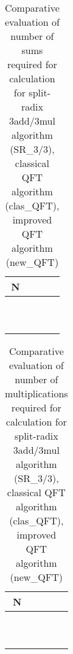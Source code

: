 \documentclass[a4paper,10pt]{article}
\begin{document}
\begin{table}[tb]
\caption{Comparative evaluation of number of sums required for  calculation for split-radix 3add/3mul algorithm (SR\_3/3), classical QFT algorithm 
(clas\_QFT), improved QFT algorithm (new\_QFT)}
\label{tab:compara_add}
\centering
\scalebox{0.7}
{
\begin{tabular}{cccc}
\toprule
N &   &  &  \\
\midrule
 &  &  &  \\
 &  &  &   \\
 &  &  &   \\
 &  &  &  \\
 &  &  &  \\
 &  &  &  \\
 &  &  &  \\
 &  &  &  \\
 &  &  &  \\
 &  &  &  \\
\bottomrule
\end{tabular}
}
\end{table}













\begin{table}[tb]
\caption{Comparative evaluation of number of multiplications required for  calculation for split-radix 3add/3mul algorithm (SR\_3/3), classical QFT algorithm 
(clas\_QFT), improved QFT algorithm (new\_QFT) }
\label{tab:compara_mol}
\centering
\scalebox{0.7}
{
\begin{tabular}{cccc}
\toprule
N &  &  &  \\
\midrule
 &  &  &  \\
 &  &  &  \\
 &  &  &  \\
 &  &  &  \\
 &  &  &  \\
 &  &  &  \\
 &  &  &  \\
 &  &  &  \\
 &  &  &  \\
 &  &  &  \\
\bottomrule
\end{tabular}
}
\end{table}
\end{document}
